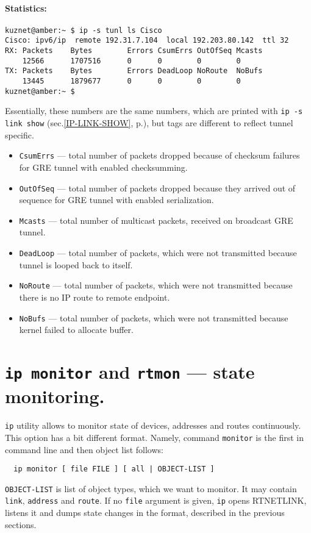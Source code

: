 \paragraph{Statistics:}

\begin{verbatim}
kuznet@amber:~ $ ip -s tunl ls Cisco
Cisco: ipv6/ip  remote 192.31.7.104  local 192.203.80.142  ttl 32 
RX: Packets    Bytes        Errors CsumErrs OutOfSeq Mcasts
    12566      1707516      0      0        0        0       
TX: Packets    Bytes        Errors DeadLoop NoRoute  NoBufs
    13445      1879677      0      0        0        0     
kuznet@amber:~ $ 
\end{verbatim}
Essentially, these numbers are the same numbers, which are
printed with {\tt ip -s link show}
(sec.\ref{IP-LINK-SHOW}, p.\pageref{IP-LINK-SHOW}), but tags are different
to reflect tunnel specific.
\begin{itemize}
\item \verb|CsumErrs| --- total number of packets dropped
because of checksum failures for GRE tunnel with enabled checksumming.
\item \verb|OutOfSeq| --- total number of packets dropped
because they arrived out of sequence for GRE tunnel with enabled
serialization.
\item \verb|Mcasts| --- total number of multicast packets,
received on broadcast GRE tunnel.
\item \verb|DeadLoop| --- total number of packets, which were not
transmitted because tunnel is looped back to itself.
\item \verb|NoRoute| --- total number of packets, which were not
transmitted because there is no IP route to remote endpoint.
\item \verb|NoBufs| --- total number of packets, which were not
transmitted because kernel failed to allocate buffer.
\end{itemize}


\section{{\tt ip monitor} and {\tt rtmon} --- state monitoring.}
\label{IP-MONITOR}

\verb|ip| utility allows to monitor state of devices, addresses
and routes continuously. This option has a bit different format.
Namely,
command \verb|monitor| is the first in command line and then
object list follows:
\begin{verbatim}
  ip monitor [ file FILE ] [ all | OBJECT-LIST ]
\end{verbatim}
\verb|OBJECT-LIST| is list of object types, which we want to monitor.
It may contain \verb|link|, \verb|address| and \verb|route|.
If no \verb|file| argument is given, \verb|ip| opens RTNETLINK,
listens it and dumps state changes in the format, described
in the previous sections.

